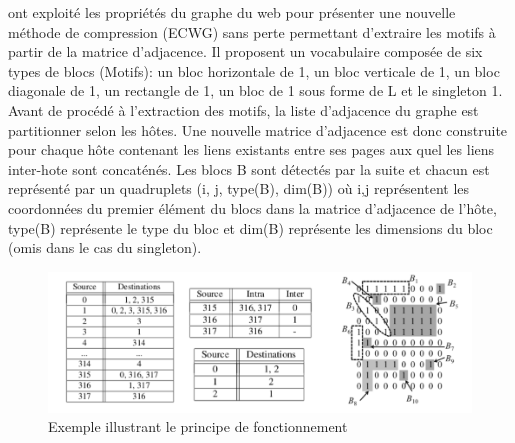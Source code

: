 
	\citep{asano2008efficient} ont exploité les propriétés du graphe du web pour présenter une nouvelle méthode de compression (ECWG) sans perte permettant d'extraire les motifs à partir de la matrice d'adjacence. Il proposent un vocabulaire composée de six types de blocs (Motifs): un bloc horizontale de 1, un bloc verticale de 1, un bloc diagonale de 1, un rectangle de 1, un bloc de 1 sous forme de L et le singleton 1. Avant de procédé à l'extraction des motifs, la liste d'adjacence du graphe est partitionner selon les hôtes. Une nouvelle matrice d'adjacence est donc construite pour chaque hôte contenant les liens existants entre ses pages aux quel les liens inter-hote sont concaténés.
					Les blocs B sont détectés par la suite et chacun est représenté par un quadruplets (i, j, type(B), dim(B)) où i,j représentent les coordonnées du premier élément du blocs dans la matrice d'adjacence de l'hôte, type(B) représente le type du bloc et dim(B) représente les dimensions du bloc (omis dans le cas du singleton). 
					\begin{figure}[h]
					\includegraphics[scale=0.5]{ressources/image/inter_intra.png} 
					\caption{Exemple illustrant le principe de fonctionnement \citep{asano2008efficient}}
					\label{interIntra}
				\end{figure}